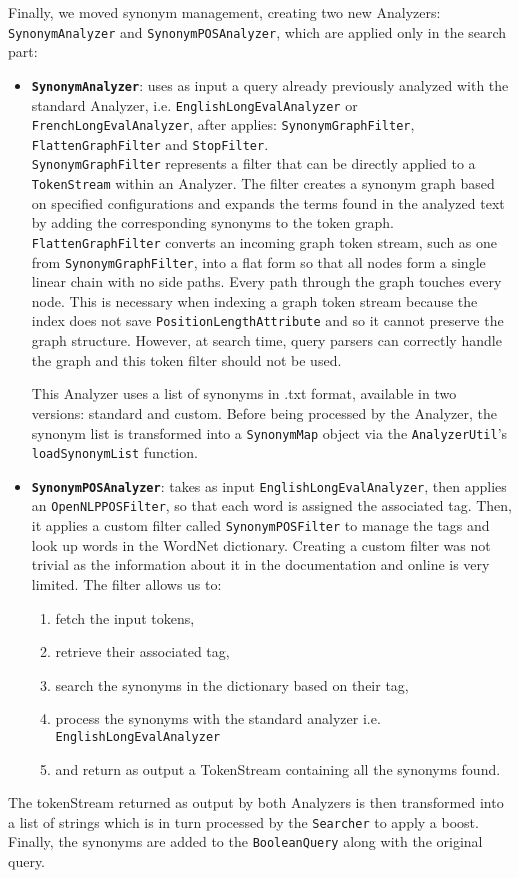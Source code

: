 Finally, we moved synonym management, creating two new Analyzers: \texttt{SynonymAnalyzer} and \texttt{SynonymPOSAnalyzer}, which are applied only in the search part:
\begin{itemize}
	\item \textbf{\texttt{SynonymAnalyzer}}: uses as input a query already previously analyzed with the standard Analyzer, i.e. \texttt{EnglishLongEvalAnalyzer} or \texttt{FrenchLongEvalAnalyzer}, after applies: \texttt{SynonymGraphFilter}, \texttt{FlattenGraphFilter} and \texttt{StopFilter}.\\ 
\texttt{SynonymGraphFilter} represents a filter that can be directly applied to a \texttt{TokenStream} within an Analyzer. The filter creates a synonym graph based on specified configurations and expands the terms found in the analyzed text by adding the corresponding synonyms to the token graph. \texttt{FlattenGraphFilter} converts an incoming graph token stream, such as one from \texttt{SynonymGraphFilter}, into a flat form so that all nodes form a single linear chain with no side paths. Every path through the graph touches every node. This is necessary when indexing a graph token stream because the index does not save \texttt{PositionLengthAttribute} and so it cannot preserve the graph structure. However, at search time, query parsers can correctly handle the graph and this token filter should not be used.

This Analyzer uses a list of synonyms in .txt format, available in two versions: standard and custom. Before being processed by the Analyzer, the synonym list is transformed into a \texttt{SynonymMap} object via the \texttt{AnalyzerUtil}'s \texttt{loadSynonymList} function. \\

	\item \textbf{\texttt{SynonymPOSAnalyzer}}: takes as input \texttt{EnglishLongEvalAnalyzer}, then applies an \texttt{OpenNLPPOSFilter}, so that each word is assigned the associated tag.
Then, it applies a custom filter called \texttt{SynonymPOSFilter} to manage the tags and look up words in the WordNet dictionary. Creating a custom filter was not trivial as the information about it in the documentation and online is very limited. 
The filter allows us to:
	\begin{enumerate}
		\item fetch the input tokens, 
		\item retrieve their associated tag, 
		\item search the synonyms in the dictionary based on their tag,
		\item process the synonyms with the standard analyzer i.e. \texttt{EnglishLongEvalAnalyzer}
		\item and return as output a TokenStream containing all the synonyms found. 
	\end{enumerate}
\end{itemize}
The tokenStream returned as output by both Analyzers is then transformed into a list of strings which is in turn processed by the \texttt{Searcher} to apply a boost. Finally, the synonyms are added to the \texttt{BooleanQuery} along with the original query.